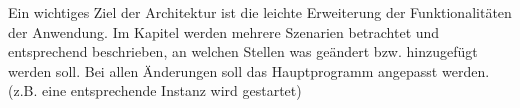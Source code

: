 Ein wichtiges Ziel der Architektur ist die leichte Erweiterung der Funktionalitäten der Anwendung. 
Im Kapitel werden mehrere Szenarien betrachtet und entsprechend beschrieben, an welchen Stellen was geändert bzw.
hinzugefügt werden soll. Bei allen Änderungen soll das Hauptprogramm angepasst werden.
(z.B. eine entsprechende Instanz wird gestartet)